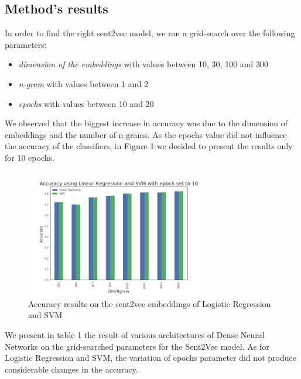 \documentclass[10pt,conference,compsocconf]{IEEEtran}
\begin{document}
\subsection{Method's results}
In order to find the right sent2vec model, we ran a grid-search over the following parameters:
\begin{itemize}
	\item \textit{dimension of the embeddings} with values between 10, 30, 100 and 300
	\item \textit{n-gram} with values between 1 and 2
	\item \textit{epochs} with values between 10 and 20
\end{itemize}

We observed that the biggest increase in accuracy was due to the dimension of embeddings and the number of n-grams. As the epochs value did not influence the accuracy of the classifiers, in Figure 1 we decided to present the results only for 10 epochs.

\begin{figure}[h]
	\includegraphics[width=8cm]{LinRegSVMaccuracy2.png}
	\caption{Accuracy results on the sent2vec embeddings of Logistic Regression and SVM}
\end{figure}

We present in table 1 the result of various architectures of Dense Neural Networks on the grid-searched parameters for the Sent2Vec model. As for Logistic Regression and SVM, the variation of epochs parameter did not produce considerable changes in the accuracy.
\end{document}
